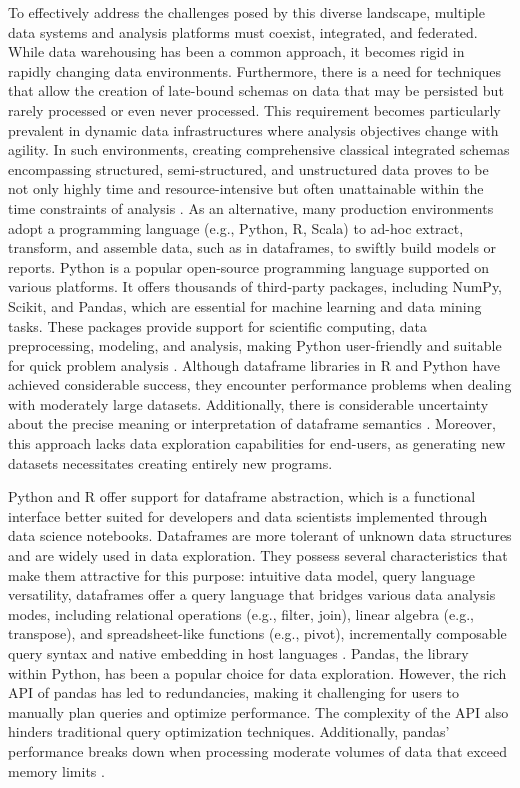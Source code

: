 To effectively address the challenges posed by this diverse landscape, multiple data systems and analysis platforms must coexist, integrated, and federated. While data warehousing has been a common approach, it becomes rigid in rapidly changing data environments. Furthermore, there is a need for techniques that allow the creation of late-bound schemas on data that may be persisted but rarely processed or even never processed. This requirement becomes particularly prevalent in dynamic data infrastructures where analysis objectives change with agility. In such environments, creating comprehensive classical integrated schemas encompassing structured, semi-structured, and unstructured data proves to be not only highly time and resource-intensive but often unattainable within the time constraints of analysis \cite{abadi2016beckman}. As an alternative, many production environments adopt a programming language (e.g., Python, R, Scala) to ad-hoc extract, transform, and assemble data, such as in dataframes, to swiftly build models or reports. Python is a popular open-source programming language supported on various platforms. It offers thousands of third-party packages, including NumPy, Scikit, and Pandas, which are essential for machine learning and data mining tasks. These packages provide support for scientific computing, data preprocessing, modeling, and analysis, making Python user-friendly and suitable for quick problem analysis \cite{Bhadani2016}. Although dataframe libraries in R and Python have achieved considerable success, they encounter performance problems when dealing with moderately large datasets. Additionally, there is considerable uncertainty about the precise meaning or interpretation of dataframe semantics \cite{petersohn2020scalable}. Moreover, this approach lacks data exploration capabilities for end-users, as generating new datasets necessitates creating entirely new programs. 

Python and R offer support for dataframe abstraction, which is a functional interface better suited for developers and data scientists implemented through data science notebooks. Dataframes are more tolerant of unknown data structures and are widely used in data exploration. They possess several characteristics that make them attractive for this purpose: intuitive data model, query language versatility, dataframes offer a query language that bridges various data analysis modes, including relational operations (e.g., filter, join), linear algebra (e.g., transpose), and spreadsheet-like functions (e.g., pivot), incrementally composable query syntax and native embedding in host languages \cite{perez2015project}. Pandas, the library within Python, has been a popular choice for data exploration. However, the rich API of pandas has led to redundancies, making it challenging for users to manually plan queries and optimize performance. The complexity of the API also hinders traditional query optimization techniques. Additionally, pandas' performance breaks down when processing moderate volumes of data that exceed memory limits \cite{petersohn2020scalable}.

